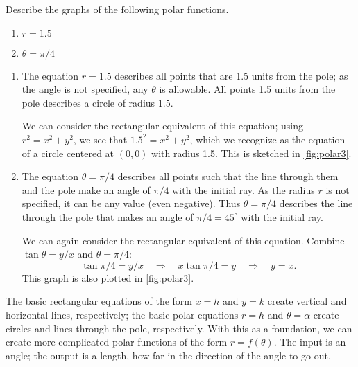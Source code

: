 \begin{example}\label{ex_polar3}
Describe the graphs of the following polar functions.
\begin{enumerate}
	\item $r = 1.5$
	\item $\theta = \pi/4 $
\end{enumerate}
%
\solution
\begin{enumerate}
\item		The equation $r=1.5$ describes all points that are 1.5 units from the pole; as the angle is not specified, any $\theta$ is allowable. All points 1.5 units from the pole describes a circle of radius 1.5.

We can consider the rectangular equivalent of this equation; using $r^2=x^2+y^2$, we see that $1.5^2=x^2+y^2$, which we recognize as the equation of a circle centered at $(0,0)$ with radius 1.5. This is sketched in \autoref{fig:polar3}.


\item		The equation $\theta = \pi/4$ describes all points such that the line through them and the pole make an angle of $\pi/4$ with the initial ray. As the radius $r$ is not specified, it can be any value (even negative). Thus $\theta = \pi/4$ describes the line through the pole that makes an angle of $\pi/4 = 45^\circ$ with the initial ray.

We can again consider the rectangular equivalent of this equation. Combine $\tan \theta =y/x$ and $\theta =\pi/4$:
\[\tan \pi/4 = y/x \quad \Rightarrow \quad x\tan \pi/4 = y \quad \Rightarrow \quad y = x.\] 
This graph is also plotted in \autoref{fig:polar3}.
\end{enumerate}
\end{example}

The basic rectangular equations of the form $x=h$ and $y=k$ create vertical and horizontal lines, respectively; the basic polar equations $r= h$ and $\theta =\alpha$ create circles and lines through the pole, respectively. With this as a foundation, we can create more complicated polar functions of the form $r=f(\theta)$. The input is an angle; the output is a length, how far in the direction of the angle to go out.

